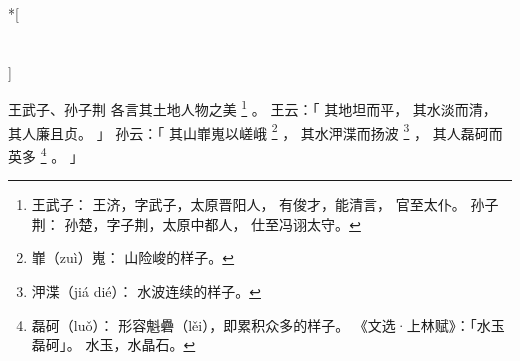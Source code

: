 
\switchcolumn[0]*[\section{}]

王武子、孙子荆
各言其土地人物之美%
\footnote{%
    王武子：
        王济，字武子，太原晋阳人，
        有俊才，能清言，
        官至太仆。
    孙子荆：
        孙楚，字子荆，太原中都人，
        仕至冯诩太守。
}%
。
王云：「
    其地坦而平，
    其水淡而清，
    其人廉且贞。
」
孙云：「
    其山㠑嵬以嵯峨%
    \footnote{%
        㠑（zuì）嵬：
            山险峻的样子。
    }%
    ，
    其水㳌渫而扬波%
    \footnote{%
        㳌渫（jiá dié）：
            水波连续的样子。
    }%
    ，
    其人磊砢而英多%
    \footnote{%
        磊砢（luǒ）：
            形容魁礨（lěi），即累积众多的样子。
            《文选·上林赋》：「水玉磊砢」。
            水玉，水晶石。
    }%
    。
」

\switchcolumn



